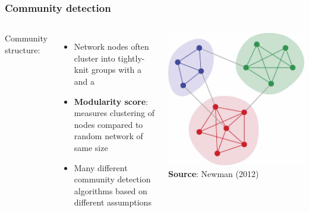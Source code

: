 \documentclass{beamer}
\begin{document}
\begin{frame}
	\frametitle{Community detection}
	\begin{columns}
		\alert{Community structure:}
		\begin{itemize}
			\item Network nodes often cluster into tightly-knit groups with a {\color{red}{high density of within-group edges}} and a {\color{blue}{lower density of between-group edges}}
			\item \textbf{Modularity score}: measures clustering of nodes compared to random network of same size
			\item Many different \alert{community detection algorithms} based on different assumptions
		\end{itemize}
		
		\centering
		\includegraphics[width=1\textwidth]{figures/modularity.jpg}\\
		\textbf{Source}: Newman (2012)
	\end{columns}
\end{frame}
\end{document}
